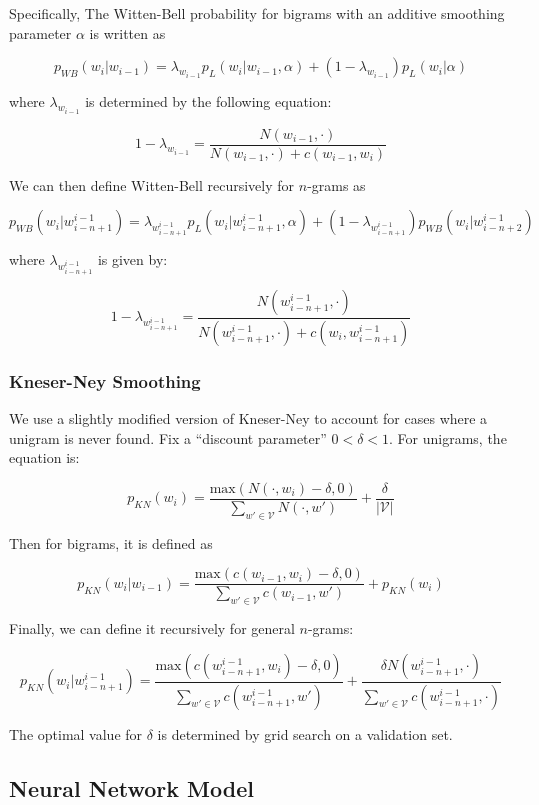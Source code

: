 \documentclass[11pt]{article}
\begin{document}
Specifically, The Witten-Bell probability for bigrams with an additive smoothing parameter $\alpha$ is written as

$$p_{WB}(w_i|w_{i-1}) = \lambda_{w_{i-1}} p_L(w_i|w_{i-1}, \alpha) + (1-\lambda_{w_{i-1}}) p_L(w_i| \alpha)$$

where $\lambda_{w_{i-1}}$ is determined by the following equation:

$$1 - \lambda_{w_{i-1}} = \frac{N(w_{i-1}, \cdot)}{N(w_{i-1}, \cdot) + c(w_{i-1}, w_i)}$$

We can then define Witten-Bell recursively for $n$-grams as

$$p_{WB}(w_i|w^{i-1}_{i-n+1}) = \lambda_{w^{i-1}_{i-n+1}} p_L(w_i|w^{i-1}_{i-n+1}, \alpha) + (1-\lambda_{w^{i-1}_{i-n+1}}) p_{WB}(w_i|w^{i-1}_{i-n+2})$$

where $\lambda_{w^{i-1}_{i-n+1}}$ is given by:

$$1 - \lambda_{w^{i-1}_{i-n+1}} = \frac{N(w^{i-1}_{i-n+1}, \cdot)}{N(w^{i-1}_{i-n+1}, \cdot) + c(w_i, w^{i-1}_{i-n+1})}$$ 

\subsubsection{Kneser-Ney Smoothing}

We use a slightly modified version of Kneser-Ney to account for cases where a unigram is never found. Fix a ``discount parameter'' $0 < \delta < 1$. For unigrams, the equation is:

$$p_{KN}(w_i) = \frac{\text{max}(N(\cdot, w_i)-\delta, 0)}{\sum_{w' \in \mathcal{V}} N(\cdot, w')} + \frac{\delta}{|\mathcal{V}|}$$

Then for bigrams, it is defined as 

$$p_{KN}(w_i | w_{i-1}) = \frac{\text{max}(c(w_{i-1}, w_i) - \delta, 0)}{\sum_{w' \in \mathcal{V}} c(w_{i-1}, w')} + p_{KN}(w_i)$$

Finally, we can define it recursively for general $n$-grams:

$$p_{KN}(w_i | w^{i-1}_{i-n+1}) = \frac{\text{max}(c(w^{i-1}_{i-n+1}, w_i) - \delta, 0)}{\sum_{w' \in \mathcal{V}}c(w^{i-1}_{i-n+1}, w')} + \frac{\delta N(w^{i-1}_{i-n+1}, \cdot)}{\sum_{w' \in \mathcal{V}} c(w^{i-1}_{i-n+1}, \cdot)}$$

The optimal value for $\delta$ is determined by grid search on a validation set. 

\subsection{Neural Network Model}
\end{document}
